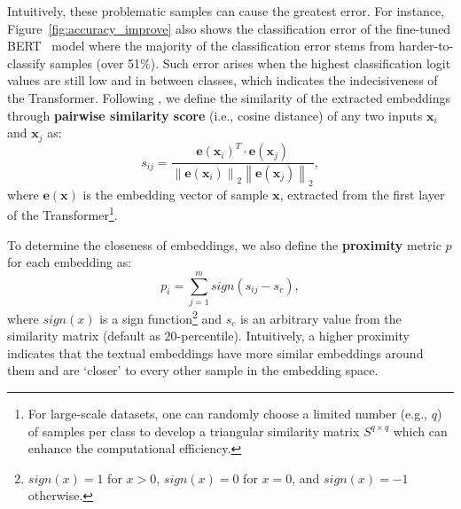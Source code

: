 \documentclass[letterpaper]{article} \usepackage{aaai22}  \usepackage{times}  \usepackage{helvet}  \usepackage{courier}  \usepackage{amsmath,amssymb}
\begin{document}
Intuitively, these problematic samples can cause the greatest error.
For instance, Figure~\ref{fig:accuracy_improve} also shows the classification error of the fine-tuned BERT~\cite{devlin2018bert} model where the majority of the classification error stems from harder-to-classify samples (over 51\%).
Such error arises when the highest classification logit values are still low and in between classes, which indicates the indecisiveness of the Transformer. 
Following \cite{han2019noisy}, we define the similarity of the extracted embeddings through {\bf pairwise similarity score} (i.e., cosine distance) of any two inputs $\mathbf{x}_i$ and $\mathbf{x}_j$ as:
\begin{equation}
s_{i j} = \frac{ \mathbf{e}\left(\mathbf{x}_{i}\right)^{T}\cdot \mathbf{e}\left(\mathbf{x}_{j}\right)}{\left\|\mathbf{e}\left(\mathbf{x}_{i}\right)\right\|_2\left\|\mathbf{e}\left(\mathbf{x}_{j}\right)\right\|_2},
\end{equation}
where $\mathbf{e}(\mathbf{x})$ is the embedding vector of sample $\mathbf{x}$, extracted from the first layer of the Transformer\footnote{For large-scale datasets, one can randomly choose a limited number
(e.g., $q$) 
of samples per class to develop a triangular similarity matrix $S^{q\times q}$ which can enhance the computational efficiency.}. 


To determine the closeness of embeddings, we also define the {\bf proximity} metric $p$ for each embedding as:
\begin{equation}
p_{i}=\sum_{j=1}^{m} sign\left(s_{i j}-s_{c}\right),
\end{equation}
where $sign(x)$ is a sign function\footnote{$sign(x) = 1$ for $x > 0$, $sign(x) = 0$ for $x = 0$, and $sign(x) = -1$ otherwise.} 
and $s_c$ is an arbitrary value from the similarity matrix (default as 20-percentile).
Intuitively, a higher proximity indicates that the textual embeddings have more similar embeddings around them and are `closer' to every other sample in the embedding space.
\end{document}
